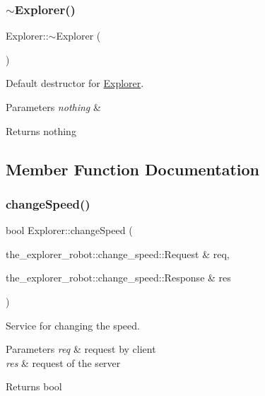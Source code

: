 \subsubsection{\texorpdfstring{$\sim$\+Explorer()}{~Explorer()}}
{\footnotesize\ttfamily Explorer\+::$\sim$\+Explorer (\begin{DoxyParamCaption}{ }\end{DoxyParamCaption})}



Default destructor for \mbox{\hyperlink{classExplorer}{Explorer}}. 


\begin{DoxyParams}{Parameters}
{\em nothing} & \\
\hline
\end{DoxyParams}
\begin{DoxyReturn}{Returns}
nothing 
\end{DoxyReturn}


\subsection{Member Function Documentation}
\mbox{\label{classExplorer_aa860260292752413282de7f9d9ddfbc2}} 
\subsubsection{\texorpdfstring{change\+Speed()}{changeSpeed()}}
{\footnotesize\ttfamily bool Explorer\+::change\+Speed (\begin{DoxyParamCaption}\item[{the\+\_\+explorer\+\_\+robot\+::change\+\_\+speed\+::\+Request \&}]{req,  }\item[{the\+\_\+explorer\+\_\+robot\+::change\+\_\+speed\+::\+Response \&}]{res }\end{DoxyParamCaption})}



Service for changing the speed. 


\begin{DoxyParams}{Parameters}
{\em req} & request by client \\
\hline
{\em res} & request of the server\\
\hline
\end{DoxyParams}
\begin{DoxyReturn}{Returns}
bool 
\end{DoxyReturn}
\mbox{\label{classExplorer_a246ceb49142bbd15bdbdc3b900269294}} 
